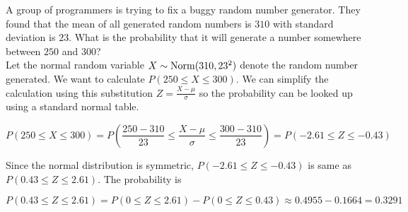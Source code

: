 \begin{texample}
	A group of programmers is trying to fix a buggy random number generator. They found that the mean of all generated random numbers is $310$ with standard deviation is $23$. What is the probability that it will generate a number somewhere between $250$ and $300$? \\
	
	Let the normal random variable $X\sim \operatorname{Norm}(310, 23^2)$ denote the random number generated. We want to calculate $P(250\le X\le 300)$. We can simplify the calculation using this substitution $Z=\frac{X-\mu}{\sigma}$ so the probability can be looked up using a standard normal table.
	
	$$P(250\le X\le 300) = P(\frac{250-310}{23} \le \frac{X-\mu}{\sigma} \le \frac{300-310}{23}) = P(-2.61 \le Z \le -0.43)$$
	
	Since the normal distribution is symmetric, $P(-2.61 \le Z \le -0.43)$ is same as $P(0.43 \le Z \le 2.61)$. The probability is
	
	$$P(0.43 \le Z \le 2.61)=P(0 \le Z \le 2.61) - P(0 \le Z \le 0.43) \approx 0.4955 - 0.1664=0.3291$$
\end{texample}

